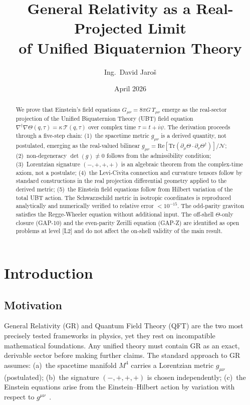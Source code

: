 \documentclass[12pt,a4paper]{article}
\title{\textbf{General Relativity as a Real-Projected Limit\\
       of Unified Biquaternion Theory}}
\author{Ing.\ David Jaroš}
\date{April 2026}
\theoremstyle{definition}
\theoremstyle{remark}
\newcommand{\Tr}{\mathrm{Tr}}
\newcommand{\re}{\mathrm{Re}}
\newcommand{\calN}{\mathcal{N}}
\begin{document}
\maketitle

\begin{abstract}
We prove that Einstein's field equations $G_{\mu\nu} = 8\pi G\,T_{\mu\nu}$
emerge as the real-sector projection of the Unified Biquaternion Theory (UBT)
field equation
$\nabla^\dagger\nabla\Theta(q,\tau) = \kappa\,\mathcal{T}(q,\tau)$
over complex time $\tau = t + i\psi$.
The derivation proceeds through a five-step chain:
(1)~the spacetime metric $g_{\mu\nu}$ is a derived quantity, not postulated,
emerging as the real-valued bilinear
$g_{\mu\nu} = \re[\Tr(\partial_\mu\Theta \cdot \partial_\nu\Theta^\dagger)]/\calN$;
(2)~non-degeneracy $\det(g) \neq 0$ follows from the admissibility condition;
(3)~Lorentzian signature $(-,+,+,+)$ is an algebraic theorem from the
complex-time axiom, not a postulate;
(4)~the Levi-Civita connection and curvature tensors follow by standard constructions in the real projection
differential geometry applied to the derived metric;
(5)~the Einstein field equations follow from Hilbert variation of the total
UBT action.
The Schwarzschild metric in isotropic coordinates is reproduced analytically
and numerically verified to relative error $< 10^{-15}$.
The odd-parity graviton satisfies the Regge-Wheeler equation without
additional input.
The off-shell $\Theta$-only closure (GAP-10) and the even-parity Zerilli
equation (GAP-Z) are identified as open problems at level [L2] and do not
affect the on-shell validity of the main result.
\end{abstract}

\tableofcontents
\bigskip\bigskip

\section{Introduction}
\label{sec:intro}

\subsection{Motivation}

General Relativity (GR) and Quantum Field Theory (QFT) are the two most
precisely tested frameworks in physics, yet they rest on incompatible
mathematical foundations.
Any unified theory must contain GR as an exact, derivable sector before
making further claims.
The standard approach to GR assumes:
(a)~the spacetime manifold $M^4$ carries a Lorentzian metric $g_{\mu\nu}$
(postulated);
(b)~the signature $(-,+,+,+)$ is chosen independently;
(c)~the Einstein equations arise from the Einstein--Hilbert action by
variation with respect to $g^{\mu\nu}$~\cite{einstein1915,hilbert1915}.
\end{document}
